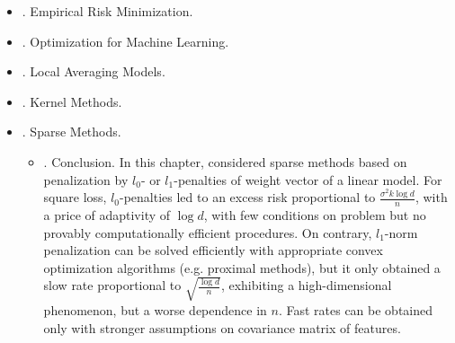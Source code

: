 \documentclass{article}
\begin{document}
\begin{enumerate}
\begin{itemize}
\begin{itemize}
\begin{itemize}
				{\bf$QR$ factorization.} $QR$ decomposition factorizes matrix $\Phi$ as $\Phi = QR$, where $Q\in\mathbb{R}^{n\times n}$ has orthonormal columns, i.e., $Q^\top Q = I,R\in\mathbb{R}^{d\times d}$ is upper triangular (see Golub \& Loan, 1996). Computing a $QR$ decomposition is faster \& more stable than inverting a matrix. Then have $\Phi^\top\Phi = R^\top Q^\top QR = R^\top R$, \& $R$: Cholesky factor of positive semidefinite matrix $\Phi^\top\Phi\in\mathbb{R}^d$. Since $R$ is invertible, one then has
				\begin{equation*}
					(\Phi^\top\Phi)\hat{\theta} = \Phi^\top y\Leftrightarrow R^\top Q^\top QR\hat{\theta} = R^\top Q^\top y\Leftrightarrow R^\top R\hat{\theta} = R^\top Q^\top y\Leftrightarrow R\hat{\theta} = Q^\top y.
				\end{equation*}
				Only remains to solve a triangular linear system, which is easy. Overall running time complexity remains $O(d^3)$. Conjugate gradient algorithm can also be used (see Golub \& Loan, 1996, for details).
				
				{\bf Gradient descent.} Can bypass need for matrix inversion or factorization using gradient descent (GD). It consists in approximately minimizing $\widehat{\cal R}$ by taking an initial point $\theta_0\in\mathbb{R}^d$ \& iteratively going toward minimizer by following opposite of gradient: $\theta_t = \theta_{t-1} - \gamma\widehat{\cal R}'(\theta_{t-1})$ for $t\ge1$, where $\gamma > 0$: step size. When these iterates converge, it is toward OLS estimator since a fixed-point $\theta$ satisfies $\widehat{\cal R}'(\theta) = 0$. Study such algorithms in Chap. 5, with running-time complexities going down to linear in $d$, e.g., $O(nd)$.
			\end{itemize}
			\item {. Statistical Analysis of Ordinary Least-Squares.}
		\end{itemize}
		\item {. Empirical Risk Minimization.}
		\item {. Optimization for Machine Learning.}
		\item {. Local Averaging Models.}
		\item {. Kernel Methods.}
		\item {. Sparse Methods.}
		\begin{itemize}
			\item {. Conclusion.} In this chapter, considered sparse methods based on penalization by $l_0$- or $l_1$-penalties of weight vector of a linear model. For square loss, $l_0$-penalties led to an excess risk proportional to $\frac{\sigma^2k\log d}{n}$, with a price of adaptivity of $\log d$, with few conditions on problem but no provably computationally efficient procedures. On contrary, $l_1$-norm penalization can be solved efficiently with appropriate convex optimization algorithms (e.g. proximal methods), but it only obtained a slow rate proportional to $\sqrt{\frac{\log d}{n}}$, exhibiting a high-dimensional phenomenon, but a worse dependence in $n$. Fast rates can be obtained only with stronger assumptions on covariance matrix of features.
			

\end{itemize}
\end{itemize}
\end{enumerate}
\end{document}
